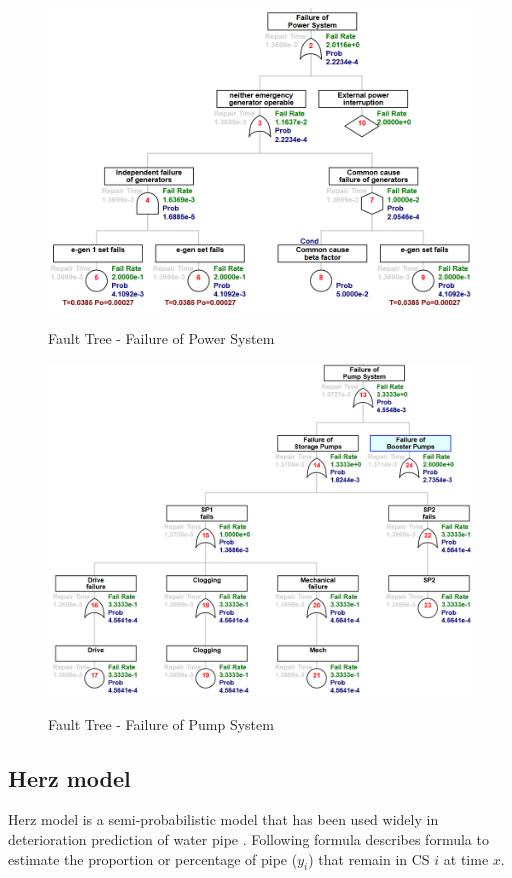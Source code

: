 \begin{figure}[!htb]
	\includegraphics[scale=1.3]{figures/fta02} \\
	\caption{Fault Tree - Failure of Power System}
	\label{fta02} 
\end{figure}

\begin{figure}[t]
	\includegraphics[scale=1.3]{figures/fta03} \\
	\caption{Fault Tree - Failure of Pump System}
	\label{fta03} 
\end{figure}



\subsection{Herz model}
Herz model is a semi-probabilistic model that has been used widely in deterioration prediction of water pipe \cite{Herz1996, Herz1996a, Herz1998}. Following formula describes formula to estimate the proportion or percentage of pipe ($y_i$) that remain in CS $i$ at time $x$.

